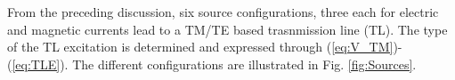 \documentclass[11pt]{article}
\renewcommand{\^}{\hat}  %
\begin{document}
  From the preceding discussion, six source configurations, three each for electric and magnetic currents lead to a TM/TE based trasnmission line (TL). The type of the TL excitation is determined and expressed through (\ref{eq:V_TM})-(\ref{eq:TLE}). The different configurations are illustrated in Fig. \ref{fig:Sources}.

  \clearpage %
  
  
\end{document}
